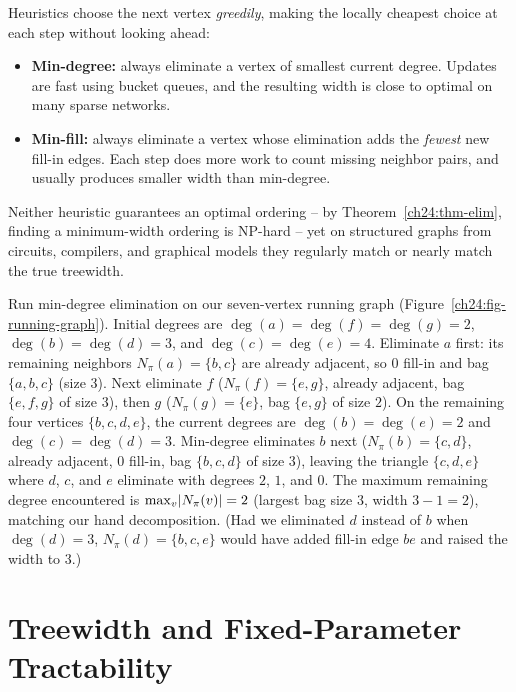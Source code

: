 Heuristics choose the next vertex \emph{greedily}, making the locally cheapest
choice at each step without looking ahead:

\begin{itemize}
  \item \textbf{Min-degree:} always eliminate a vertex of smallest current degree.
        Updates are fast using bucket queues, and the resulting width is close to
        optimal on many sparse networks.
  \item \textbf{Min-fill:} always eliminate a vertex whose elimination adds the
        \emph{fewest} new fill-in edges. Each step does more work to count missing
        neighbor pairs, and usually produces smaller width than min-degree.
\end{itemize}

Neither heuristic guarantees an optimal ordering -- by Theorem~\ref{ch24:thm-elim},
finding a minimum-width ordering is NP-hard -- yet on structured graphs from
circuits, compilers, and graphical models they regularly match or nearly match the
true treewidth.

\begin{labbox}
Run min-degree elimination on our seven-vertex running graph (Figure~\ref{ch24:fig-running-graph}).
Initial degrees are $\deg(a)=\deg(f)=\deg(g)=2$, $\deg(b)=\deg(d)=3$, and $\deg(c)=\deg(e)=4$.
Eliminate $a$ first: its remaining neighbors $N_\pi(a)=\{b,c\}$ are already adjacent, so $0$ fill-in and bag $\{a,b,c\}$ (size $3$).
Next eliminate $f$ ($N_\pi(f)=\{e,g\}$, already adjacent, bag $\{e,f,g\}$ of size $3$), then $g$ ($N_\pi(g)=\{e\}$, bag $\{e,g\}$ of size $2$).
On the remaining four vertices $\{b,c,d,e\}$, the current degrees are $\deg(b)=\deg(e)=2$ and $\deg(c)=\deg(d)=3$.
Min-degree eliminates $b$ next ($N_\pi(b)=\{c,d\}$, already adjacent, $0$ fill-in, bag $\{b,c,d\}$ of size $3$), leaving the triangle $\{c,d,e\}$ where $d$, $c$, and $e$ eliminate with degrees $2$, $1$, and $0$.
The maximum remaining degree encountered is $\max_v \lvert N_\pi(v)\rvert=2$ (largest bag size $3$, width $3-1=2$), matching our hand decomposition.
(Had we eliminated $d$ instead of $b$ when $\deg(d)=3$, $N_\pi(d)=\{b,c,e\}$ would have added fill-in edge $be$ and raised the width to $3$.)
\end{labbox}

\section{Treewidth and Fixed-Parameter Tractability}
\label{ch24:fpt}

